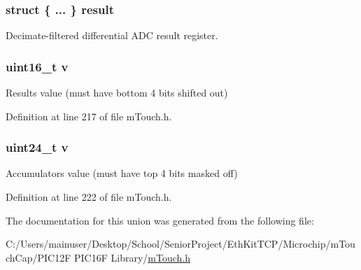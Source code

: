 \subsubsection[{result}]{\setlength{\rightskip}{0pt plus 5cm}struct \{ ... \}   result}\label{unionm_touch___acquisition_data_aa9f33fb9109737957f344599a3935aa6}


Decimate-\/filtered differential A\+D\+C result register. 

\hypertarget{unionm_touch___acquisition_data_ac5f38113a34f9eab3e7782eade81d266}{}
\subsubsection[{v}]{\setlength{\rightskip}{0pt plus 5cm}uint16\+\_\+t v}\label{unionm_touch___acquisition_data_ac5f38113a34f9eab3e7782eade81d266}


Result\textquotesingle{}s value (must have bottom 4 bits shifted out) 



Definition at line 217 of file m\+Touch.\+h.

\hypertarget{unionm_touch___acquisition_data_a2ac4eeaa6f2e6b470ddb2deec565fa7c}{}
\subsubsection[{v}]{\setlength{\rightskip}{0pt plus 5cm}uint24\+\_\+t v}\label{unionm_touch___acquisition_data_a2ac4eeaa6f2e6b470ddb2deec565fa7c}


Accumulator\textquotesingle{}s value (must have top 4 bits masked off) 



Definition at line 222 of file m\+Touch.\+h.



The documentation for this union was generated from the following file\+:\begin{DoxyCompactItemize}
\item 
C\+:/\+Users/mainuser/\+Desktop/\+School/\+Senior\+Project/\+Eth\+Kit\+T\+C\+P/\+Microchip/m\+Touch\+Cap/\+P\+I\+C12\+F P\+I\+C16\+F Library/\hyperlink{m_touch_cap_2_p_i_c12_f_01_p_i_c16_f_01_library_2m_touch_8h}{m\+Touch.\+h}\end{DoxyCompactItemize}
